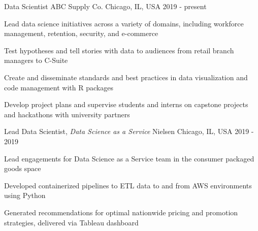 
\begin{cventries}

  \cventry
    {Data Scientist} %
    {ABC Supply Co.} %
    {Chicago, IL, USA} %
    {2019 - present} %
    {
      \begin{cvitems}
        \item {Lead data science initiatives across a variety of domains, including workforce management, retention, security, and e-commerce}
        \item {Test hypotheses and tell stories with data to audiences from retail branch managers to C-Suite}
        \item {Create and disseminate standards and best practices in data visualization and code management with R packages}
        \item {Develop project plans and supervise students and interns on capstone projects and hackathons with university partners}
      \end{cvitems}
    }

 \cventry
    {Lead Data Scientist, \textit{Data Science as a Service}} %
    {Nielsen} %
    {Chicago, IL, USA} %
    {2019 - 2019} %
    {
      \begin{cvitems}
        \item {Lead engagements for Data Science as a Service team in the consumer packaged goods space}
        \item {Developed containerized pipelines to ETL data to and from AWS environments using Python}
        \item {Generated recommendations for optimal nationwide pricing and promotion strategies, delivered via Tableau dashboard}
      \end{cvitems}
    }


\end{cventries}
